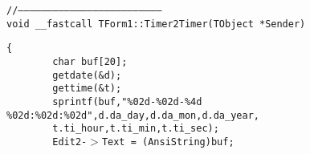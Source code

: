 \documentclass[10pt]{article}
\begin{document}
{\raggedright
\texttt{//---------------------------------------------------------------------------
\\
void \_\_fastcall TForm1::Timer2Timer(TObject *Sender)
\\
}
}

{\raggedright
\texttt{\{
\\
~ ~ ~ ~ char buf[20];
\\
~ ~ ~ ~ getdate(\&d);
\\
~ ~ ~ ~ gettime(\&t);
\\
~ ~ ~ ~ sprintf(buf,"\%02d-\%02d-\%4d
\%02d:\%02d:\%02d",d.da\_day,d.da\_mon,d.da\_year,
\\
~ ~ ~ ~ t.ti\_hour,t.ti\_min,t.ti\_sec);
\\
~ ~ ~ ~ Edit2-$>$Text = (AnsiString)buf;
\\

}}
\end{document}
